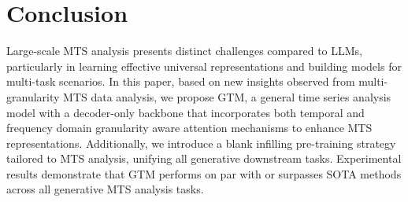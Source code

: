 \section{Conclusion}
Large-scale MTS analysis presents distinct challenges compared to LLMs, particularly in learning effective universal representations and building models for multi-task scenarios. In this paper, based on new insights observed from multi-granularity MTS data analysis, we propose GTM, a general time series analysis model with a decoder-only backbone that incorporates both temporal and frequency domain granularity aware attention mechanisms to enhance MTS representations. Additionally, we introduce a blank infilling pre-training strategy tailored to MTS analysis, unifying all generative downstream tasks. Experimental results demonstrate that GTM performs on par with or surpasses SOTA methods across all generative MTS analysis tasks.
